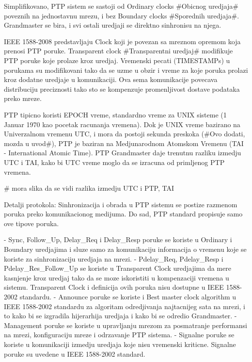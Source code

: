 \documentclass[a4paper,12pt, master]{etf}
\begin{document}
	Simplifikovano, PTP sistem se sastoji od Ordinary clocks \#Obicnog uredjaja\# poveznih na
	jednostavnu mrezu, i bez Boundary clocks \#Sporednih uredjaja\#. Grandmaster se bira, i svi
	ostali uredjaji se direktno sinhronisu na njega.

	IEEE 1588-2008 predstavljaju Clock koji je povezan sa mreznom opremom koja prenosi PTP 
	poruke.	Transparent clock \#Transparentni uredjaj\# modifikuje PTP poruke koje prolaze 
	kroz uredjaj. Vremenski pecati (TIMESTAMPs) u porukama su modifikovani tako da se uzme u 
	obzir i vreme za koje poruka prolazi kroz dodatne uredjaje u komunikaciji. Ova sema 
	komunikacije povecava distribuciju preciznosti tako sto se kompenzuje promenljivost 
	dostave podataka preko mreze.

	PTP tipicno koristi EPOCH vreme, standardno vreme za UNIX sisteme (1 Januar 1970 kao 
	pocetak	racunanja vremena). Dok je UNIX vreme bazirano na Univerzalnom vremenu UTC, i mora 
	da postoji sekunda preskoka (\#Ovo dodati, mozda u uvod\#), PTP je baziran na 
	Medjunarodnom Atomskom Vremenu (TAI - International Atomic Time). PTP Grandmaster daje 
	trenutnu razliku izmedju UTC i TAI,	kako bi UTC vreme moglo da se izracuna od primljenog 
	PTP vremena.

	\# mora slika da se vidi razlika izmedju UTC i PTP, TAI

	Detalji protokola:
	Sinhronizacija i obrada u PTP sistemu se postize razmenom poruka preko komunikacionog 
	medijuma. Do sad, PTP standard propisuje samo ove tipove poruka.

	- Sync, Follow\_Up, Delay\_Req i Delay\_Resp poruke se koriste u Ordinary i Boundary 
	uredjajima i sluze samo za komunikaciju informacija o vremenu koje se koriste za 
	sinhronizaciju uredjaja na mrezi.
	- Pdelay\_Req, Pdelay\_Resp i Pdelay\_Res\_Follow\_Up se koriste u Transparent Clock 
	uredjajima da mere kasnjenje kroz uredjaj tako da se moze iskoristiti u kompenzaciji 
	vremena u sistemu. Transparent Clock i definicija ovih poruka nisu dostupne u IEEE 
	1588-2002 standardu.
	- Announce poruke se koriste i Best master clock algorithm u IEEE 1588-2002 standardu za
	algoritam odredjivanja najtacnijeg sata na mrezi, i to kako bi se izgradila hijerarhija
	uredjaja i kako bi se odredio Grandmaster.
	- Management poruke se koriste u upravljanju mrezom za posmatranje performansi na mrezi,
	konfiguraciju mreze i odrzavanje PTP sistema.
	- Signalne poruke se koriste u komunikaciji izmedju uredjaja koje nisu vremenski kriticne.
	Signalne poruke su uvedene u IEEE 1588-2002 standard.
\end{document}
